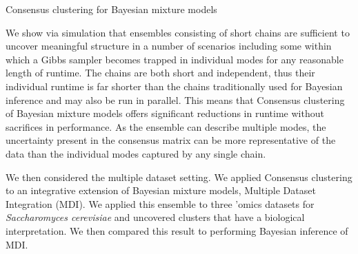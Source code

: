\documentclass[]{article}
\begin{document}
\begin{algorithm} \label{algorithm:CCforBayesianMixtures}
	\caption{Consensus clustering for Bayesian mixture models}
\end{algorithm}
We show via simulation that ensembles consisting of short chains are sufficient to uncover meaningful structure in a number of scenarios including some within which a Gibbs sampler becomes trapped in individual modes for any reasonable length of runtime. The chains are both short and independent, thus their individual runtime is far shorter than the chains traditionally used for Bayesian inference and may also be run in parallel. This means that Consensus clustering of Bayesian mixture models offers significant reductions in runtime without sacrifices in performance. As the ensemble can describe multiple modes, the uncertainty present in the consensus matrix can be more representative of the data than the individual modes captured by any single chain.

We then considered the multiple dataset setting. We applied Consensus clustering to an integrative extension of Bayesian mixture models, Multiple Dataset Integration (MDI). We applied this ensemble to three 'omics datasets for \emph{Saccharomyces cerevisiae} and uncovered clusters that have a biological interpretation. We then compared this result to performing Bayesian inference of MDI.
\end{document}
